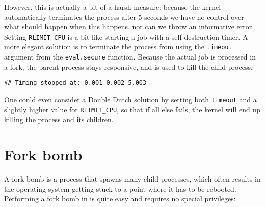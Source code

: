 However, this is actually a bit of a harsh measure: because the kernel
automatically terminates the process after 5 seconds we have no control over
what should happen when this happens, nor can we throw an informative error.
Setting \texttt{RLIMIT\_CPU} is a bit like starting a job with a
self-destruction timer. A more elegant solution is to terminate the process
from \R using the \texttt{timeout} argument from the \texttt{eval.secure}
function. Because the actual job is processed in a fork, the parent process
stays responsive, and is used to kill the child process.

\begin{knitrout}\mycodesize
{}\color{fgcolor}\begin{kframe}
\begin{alltt}
 \hlkwb{<-} \hlstd{(}\hlstd{(),}  \hlstd{=} \hlstd{))}
\end{alltt}


{\ttfamily\noindent\bfseries\color{errorcolor}{\#\# Error: R call did not return within 5 seconds. Terminating process.}}\begin{verbatim}
## Timing stopped at: 0.001 0.002 5.003
\end{verbatim}
\end{kframe}
\end{knitrout}


One could even consider a Double Dutch solution by setting both \texttt{timeout}
and a slightly higher value for \texttt{RLIMIT\_CPU}, so that if all else fails,
the kernel will end up killing the process and its children.

\section{Fork bomb}

A fork bomb is a process that spawns many child processes, which often results
in the operating system getting stuck to a point where it has to be rebooted.
Performing a fork bomb in \R is quite easy and requires no special privileges:

\begin{knitrout}\mycodesize
{}\color{fgcolor}\begin{kframe}
\begin{alltt}
 \hlkwb{<-} \hlstd{() \{}
     \hlstd{\{}
        \hlstd{(}\hlstd{())}
    \hlstd{\}}
\hlstd{\}}
\end{alltt}
\end{kframe}
\end{knitrout}


